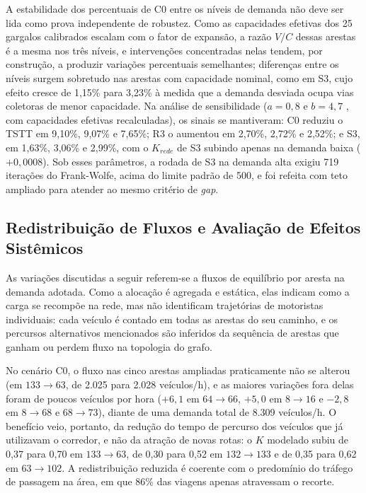 \documentclass[portuguese]{sbc2025}%
\begin{document}
A estabilidade dos percentuais de C0 entre os níveis de demanda não deve ser lida como prova independente de robustez. Como as capacidades efetivas dos 25 gargalos calibrados escalam com o fator de expansão, a razão $V/C$ dessas arestas é a mesma nos três níveis, e intervenções concentradas nelas tendem, por construção, a produzir variações percentuais semelhantes; diferenças entre os níveis surgem sobretudo nas arestas com capacidade nominal, como em S3, cujo efeito cresce de 1,15\% para 3,23\% à medida que a demanda desviada ocupa vias coletoras de menor capacidade. Na análise de sensibilidade ($a=0{,}8$ e $b=4{,}7$ \cite{vdf2023}, com capacidades efetivas recalculadas), os sinais se mantiveram: C0 reduziu o TSTT em 9,10\%, 9,07\% e 7,65\%; R3 o aumentou em 2,70\%, 2,72\% e 2,52\%; e S3, em 1,63\%, 3,06\% e 2,99\%, com o $K_{rede}$ de S3 subindo apenas na demanda baixa ($+0{,}0008$). Sob esses parâmetros, a rodada de S3 na demanda alta exigiu 719 iterações do Frank-Wolfe, acima do limite padrão de 500, e foi refeita com teto ampliado para atender ao mesmo critério de \textit{gap}.

\subsection{Redistribuição de Fluxos e Avaliação de Efeitos Sistêmicos}
As variações discutidas a seguir referem-se a fluxos de equilíbrio por aresta na demanda adotada. Como a alocação é agregada e estática, elas indicam como a carga se recompõe na rede, mas não identificam trajetórias de motoristas individuais: cada veículo é contado em todas as arestas do seu caminho, e os percursos alternativos mencionados são inferidos da sequência de arestas que ganham ou perdem fluxo na topologia do grafo.

No cenário C0, o fluxo nas cinco arestas ampliadas praticamente não se alterou (em $133\rightarrow63$, de 2.025 para 2.028 veículos/h), e as maiores variações fora delas foram de poucos veículos por hora ($+6{,}1$ em $64\rightarrow66$, $+5{,}0$ em $8\rightarrow16$ e $-2{,}8$ em $8\rightarrow68$ e $68\rightarrow73$), diante de uma demanda total de 8.309 veículos/h. O benefício veio, portanto, da redução do tempo de percurso dos veículos que já utilizavam o corredor, e não da atração de novas rotas: o $K$ modelado subiu de 0,37 para 0,70 em $133\rightarrow63$, de 0,30 para 0,52 em $132\rightarrow133$ e de 0,35 para 0,62 em $63\rightarrow102$. A redistribuição reduzida é coerente com o predomínio do tráfego de passagem na área, em que 86\% das viagens apenas atravessam o recorte.
\end{document}
